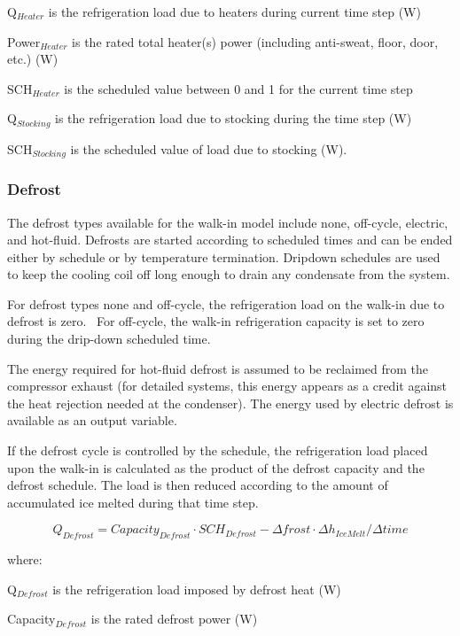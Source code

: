 Q\(_{Heater}\) is the refrigeration load due to heaters during current time step (W)

Power\(_{Heater}\) is the rated total heater(s) power (including anti-sweat, floor, door, etc.) (W)

SCH\(_{Heater}\) is the scheduled value between 0 and 1 for the current time step

Q\(_{Stocking}\) is the refrigeration load due to stocking during the time step (W)

SCH\(_{Stocking}\) is the scheduled value of load due to stocking (W).

\subsubsection{Defrost}\label{defrost}

The defrost types available for the walk-in model include none, off-cycle, electric, and hot-fluid. Defrosts are started according to scheduled times and can be ended either by schedule or by temperature termination. Dripdown schedules are used to keep the cooling coil off long enough to drain any condensate from the system.

For defrost types none and off-cycle, the refrigeration load on the walk-in due to defrost is zero.~ For off-cycle, the walk-in refrigeration capacity is set to zero during the drip-down scheduled time.

The energy required for hot-fluid defrost is assumed to be reclaimed from the compressor exhaust (for detailed systems, this energy appears as a credit against the heat rejection needed at the condenser). The energy used by electric defrost is available as an output variable.

If the defrost cycle is controlled by the schedule, the refrigeration load placed upon the walk-in is calculated as the product of the defrost capacity and the defrost schedule. The load is then reduced according to the amount of accumulated ice melted during that time step.

\begin{equation}
Q_{Defrost} = Capacity_{Defrost} \cdot SCH_{Defrost} - \Delta frost \cdot \Delta h_{IceMelt} / \Delta time
\end{equation}

where:

Q\(_{Defrost}\) is the refrigeration load imposed by defrost heat (W)

Capacity\(_{Defrost}\) is the rated defrost power (W)

